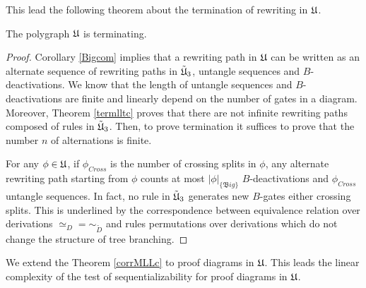 \documentclass[a4paper]{article}
\begin{document}
This lead the following theorem about the termination of rewriting in $\mathfrak{U}$.

\begin{theorem}\label{TerMllu}
The polygraph $\mathfrak{U}$ is terminating.
\begin{proof}
Corollary \ref{Bigcom} implies that a rewriting path in $\mathfrak{U}$ can be written as an alternate sequence of rewriting paths in ${\tilde{\mathfrak{U}}}_3$, untangle sequences and $B$-deactivations. We know that the length of untangle sequences and $B$-deactivations are finite and linearly depend on the number of gates in a diagram. Moreover, Theorem \ref{termlltc} proves that there are not infinite rewriting paths composed of rules in ${\tilde{\mathfrak{U}}}_3$. Then, to prove termination it suffices to prove that the number $n$ of alternations is finite.

For any $\phi\in \mathfrak{U}$, if $\phi_{Cross}$ is the number of crossing splits in $\phi$, any alternate rewriting path starting from $\phi$ counts at most $|\phi|_{\{\mathfrak Big\}}$ $B$-deactivations and $\phi_{Cross}$ untangle sequences. In fact, no rule in ${\tilde{\mathfrak{U}}}_3$ generates new $B$-gates either crossing splits. This is underlined by the correspondence between equivalence relation over derivations $\simeq_D=\sim_{\tilde D}$  and rules permutations over derivations which do not change the structure of tree branching.
\end{proof}
\end{theorem}



We extend the Theorem \ref{corrMLLc} to proof diagrams in $\mathfrak{U}$. This leads the linear complexity of the test of sequentializability for proof diagrams in $\mathfrak{U}$.
\end{document}

